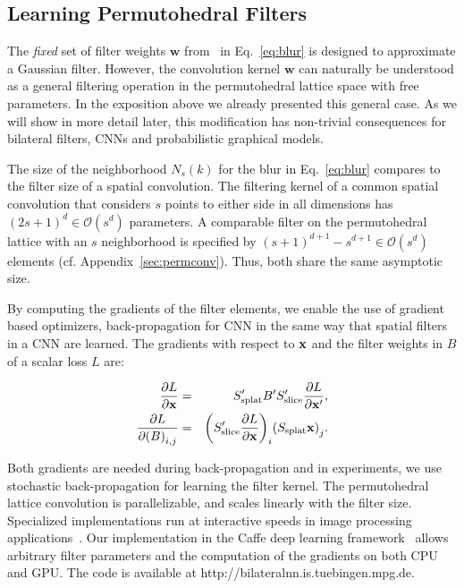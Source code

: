 \subsection{Learning Permutohedral Filters}\label{sec:backprop}
The \emph{fixed} set of filter weights $\mathbf{w}$ from~\cite{adams2010fast} in
Eq.~\ref{eq:blur} is designed to approximate a Gaussian filter. However, the
convolution kernel $\mathbf{w}$ can naturally be understood as a general filtering
operation in the permutohedral lattice space with free parameters. In the exposition above we
already presented this general case. As we will show in more detail later,
this modification has non-trivial consequences
for bilateral filters, CNNs and probabilistic graphical models.

The size of the neighborhood $N_s(k)$ for the blur in Eq.~\ref{eq:blur} compares
to the filter size of a spatial convolution. The filtering kernel of a common
spatial convolution that considers $s$ points to either side in all dimensions
has ${(2s + 1)}^d\in\mathcal{O}(s^d)$ parameters. A comparable filter on the
permutohedral lattice with an $s$ neighborhood is specified by ${(s+1)}^{d+1} -
s^{d+1} \in\mathcal{O}(s^d)$ elements (cf. Appendix~\ref{sec:permconv}).
Thus, both share the same asymptotic size.

By computing the gradients of the filter elements, we enable the use
of gradient based optimizers, \eg back-propagation for CNN in the same
way that spatial filters in a CNN are learned. The gradients
with respect to $\mathbf{x}$ and the filter weights in $B$ of a
scalar loss $L$ are:

\begin{eqnarray}
  \frac {\partial L} {\partial \bv} &=&
  S'_{\text{splat}} %
  B' %
  S'_{\text{slice}} %
  \frac {\partial L} {\partial \bv'}, \label{eq:dv}\\
  \frac {\partial L} {\partial {(B)}_{i, j}} &=&
  {\left(S'_{\text{slice}} \frac {\partial L} {\partial \bv}\right)}_i
  {(S_{\text{splat}} \bv)}_j.\label{eq:db}
\end{eqnarray}

Both gradients are needed during back-propagation and in experiments,
we use stochastic back-propagation for learning the filter kernel.
The permutohedral lattice convolution is parallelizable, and scales linearly with the
filter size. Specialized implementations run at interactive speeds in image
processing applications~\cite{adams2010fast}.
Our implementation in the Caffe deep learning framework~\cite{jia2014caffe}
allows arbitrary filter parameters and the computation
of the gradients on both CPU and GPU.
The code is available at http://bilateralnn.is.tuebingen.mpg.de.

